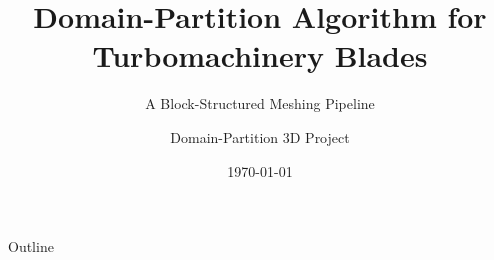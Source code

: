 \documentclass[aspectratio=169]{beamer}
\title{Domain-Partition Algorithm for Turbomachinery Blades}
\subtitle{A Block-Structured Meshing Pipeline}
\author{Domain-Partition 3D Project}
\date{\today}
\institute{}
\begin{document}
\begin{frame}
  \titlepage
\end{frame}

\begin{frame}{Outline}
  \tableofcontents
\end{frame}












\end{document}

